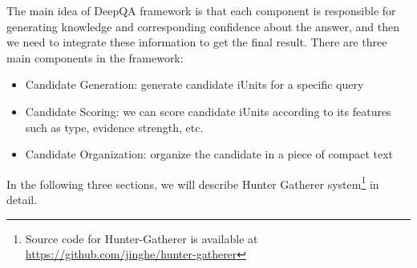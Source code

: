 

The main idea of DeepQA framework is that each component is responsible for generating knowledge and corresponding confidence about the answer, and then we need to integrate these information to get the final result.
There are three main components in the framework:

\begin{itemize}
\item Candidate Generation: generate candidate iUnits for a specific query
\item Candidate Scoring: we can score candidate iUnits according to its features such as type, evidence strength, etc.
\item Candidate Organization: organize the candidate in a piece of compact text
\end{itemize}


In the following three sections, we will describe Hunter Gatherer system\footnote{Source code for Hunter-Gatherer is available at \url{https://github.com/jinghe/hunter-gatherer}} in detail.

